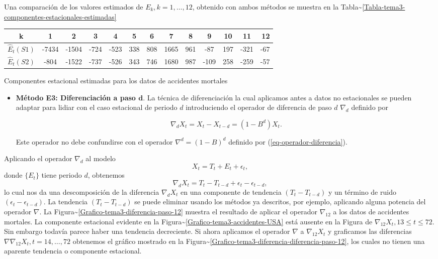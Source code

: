 \documentclass[12pt,]{krantz}
\providecommand{\tightlist}{%
  \setlength{\itemsep}{0pt}\setlength{\parskip}{0pt}}
\theoremstyle{definition}
\theoremstyle{definition}
\theoremstyle{definition}
\theoremstyle{remark}
\begin{document}
Una comparación de los valores estimados de \(E_k, k=1,\ldots,12\),
obtenido con ambos métodos se muestra en la
Tabla\textasciitilde{}\ref{Tabla-tema3-componentes-estacionales-estimadas}

\begin{longtable}[]{@{}ccccccccccccr@{}}
\toprule
k & 1 & 2 & 3 & 4 & 5 & 6 & 7 & 8 & 9 & 10 & 11 & 12\tabularnewline
\midrule
\endhead
\(\hat{E}_t(S1)\) & -7434 & -1504 & -724 & -523 & 338 & 808 & 1665 & 961
& -87 & 197 & -321 & -67\tabularnewline
\(\hat{E}_t(S2)\) & -804 & -1522 & -737 & -526 & 343 & 746 & 1680 & 987
& -109 & 258 & -259 & -57\tabularnewline
\bottomrule
\end{longtable}

Componentes estacional estimadas para los datos de accidentes mortales

\begin{itemize}
\tightlist
\item
  \textbf{Método E3: Diferenciación a paso \(\mathbf{d}\)}. La técnica
  de diferenciación la cual aplicamos antes a datos no estacionales se
  pueden adaptar para lidiar con el caso estacional de periodo \(d\)
  introduciendo el operador de diferencia de paso \(d\) \(\nabla_d\)
  definido por

  \begin{equation}
  \nabla_dX_t = X_t-X_{t-d} = (1-B^d)X_t.
  \label{eq:eq-operador-diferencia-paso-d}
  \end{equation}

  Este operador no debe confundirse con el operador
  \(\nabla^d = (1-B)^d\) definido por (\ref{eq-operador-diferencia}).
\end{itemize}

Aplicando el operador \(\nabla_d\) al modelo
\[X_t = T_t + E_t + \epsilon_t,\] donde \(\{E_t\}\) tiene periodo \(d\),
obtenemos \[\nabla_dX_t = T_t-T_{t-d} + \epsilon_t-\epsilon_{t-d},\] lo
cual nos da una descomposición de la diferencia \(\nabla_dX_t\) en una
componente de tendencia \((T_t-T_{t-d})\) y un término de ruido
\((\epsilon_t-\epsilon_{t-d})\). La tendencia \((T_t-T_{t-d})\) se puede
eliminar usando los métodos ya descritos, por ejemplo, aplicando alguna
potencia del operador \(\nabla\). La
Figura\textasciitilde{}\ref{Grafico-tema3-diferencia-paso-12} muestra el
resultado de aplicar el operador \(\nabla_{12}\) a los datos de
accidentes mortales. La componente estacional evidente en la
Figura\textasciitilde{}\ref{Grafico-tema3-accidentes-USA} está ausente
en la Figura de \(\nabla_{12}X_t,13\leq t\leq72\). Sin embargo todavía
parece haber una tendencia decreciente. Si ahora aplicamos el operador
\(\nabla\) a \(\nabla_{12}X_t\) y graficamos las diferencias
\(\nabla\nabla_{12}X_t,t=14,\ldots,72\) obtenemos el gráfico mostrado en
la
Figura\textasciitilde{}\ref{Grafico-tema3-diferencia-diferencia-paso-12},
los cuales no tienen una aparente tendencia o componente estacional.

\cleardoublepage 

\appendix {}




\backmatter
\printindex
\end{document}
